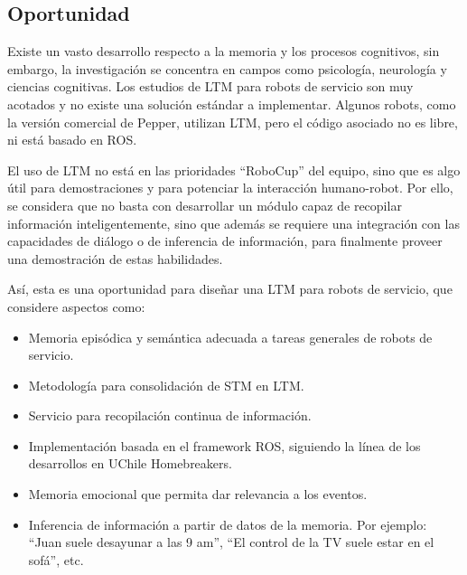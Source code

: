 \subsection{Oportunidad}

Existe un vasto desarrollo respecto a la memoria y los procesos cognitivos, sin embargo, la investigación se concentra en campos como psicología, neurología y ciencias cognitivas. Los estudios de LTM para robots de servicio son muy acotados y no existe una solución estándar a implementar. Algunos robots, como la versión comercial de Pepper, utilizan LTM, pero el código asociado no es libre, ni está basado en ROS.

El uso de LTM no está en las prioridades ``RoboCup'' del equipo, sino que es algo útil para demostraciones y para potenciar la interacción humano-robot. Por ello, se considera que no basta con desarrollar un módulo capaz de recopilar información inteligentemente, sino que además se requiere una integración con las capacidades de diálogo o de inferencia de información, para finalmente proveer una demostración de estas habilidades.

Así, esta es una oportunidad para diseñar una LTM para robots de servicio, que considere aspectos como: 
\begin{itemize}
	\item Memoria episódica y semántica adecuada a tareas generales de robots de servicio.
	\item Metodología para consolidación de STM en LTM.
	\item Servicio para recopilación continua de información.
	\item Implementación basada en el framework ROS, siguiendo la línea de los desarrollos en UChile Homebreakers.
	\item Memoria emocional que permita dar relevancia a los eventos.
	\item Inferencia de información a partir de datos de la memoria. Por ejemplo: ``Juan suele desayunar a las 9 am'', ``El control de la TV suele estar en el sofá'', etc.
\end{itemize}

